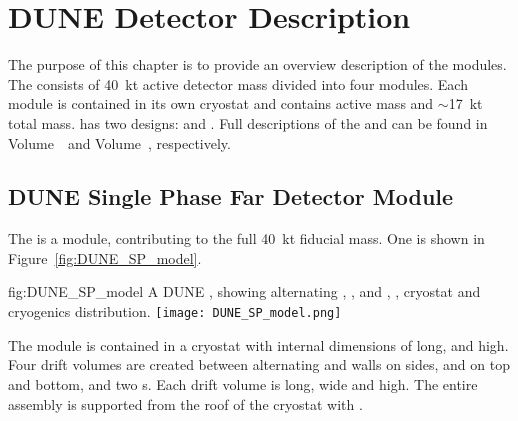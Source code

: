 \chapter{DUNE Detector Description}
\label{vl:tc-dune_overview}


The purpose of this chapter is to provide an overview description of the    modules. The  consists of \SI{40}{\kilo\tonne} active
detector mass divided into four modules. Each module is contained in
its own cryostat and contains \nominalmodsize active mass and
$\sim$\SI{17}{\kilo\tonne} total mass.  has two designs:
 and . %
Full
descriptions of the  and   can be found
in   Volume~\volnumbersp\ and  Volume~\volnumberdp{}, respectively.

\section{DUNE Single Phase Far Detector Module}
\label{sec:fdsp-SP-module}

The   is a \nominalmodsize module,
contributing to the full \SI{40}{\kilo\tonne}  fiducial
mass.  One \nominalmodsize {} is shown in
Figure~\ref{fig:DUNE_SP_model}.
\begin{dunefigure}
{fig:DUNE_SP_model} 
{A \nominalmodsize DUNE 
    , showing alternating ,
    ,  and , , cryostat
    and cryogenics distribution.}
  \texttt{[image: DUNE\_SP\_model.png]}
\end{dunefigure} 

The module is contained in a cryostat with
internal dimensions of \cryostatlen %
long, \cryostatwdth %
and \cryostatht %
high.  Four drift volumes are created between
alternating  and  walls on sides,  and
 on top and bottom, and two \endwall{}s.  Each drift volume
is \sptpclen %
long, \spmaxdrift %
wide and
\tpcheight %
high.  The entire assembly is supported from the
roof of the cryostat with .

